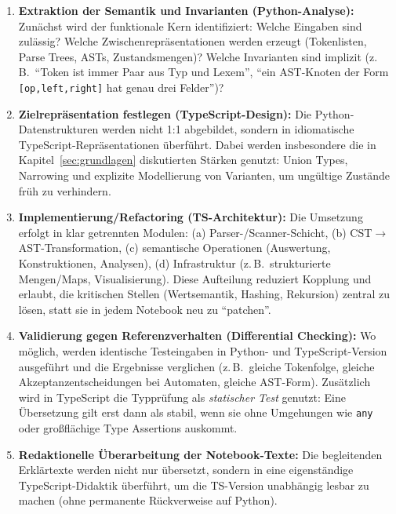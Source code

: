 \begin{enumerate}
    \item \textbf{Extraktion der Semantik und Invarianten (Python-Analyse):}
    Zunächst wird der funktionale Kern identifiziert: Welche Eingaben sind zulässig? Welche Zwischenrepräsentationen werden erzeugt (Tokenlisten, Parse Trees, ASTs, Zustandsmengen)? Welche Invarianten sind implizit (z.\,B.\ \enquote{Token ist immer Paar aus Typ und Lexem}, \enquote{ein AST-Knoten der Form \texttt{[op,left,right]} hat genau drei Felder})?

    \item \textbf{Zielrepräsentation festlegen (TypeScript-Design):}
    Die Python-Datenstrukturen werden nicht 1:1 abgebildet, sondern in idiomatische TypeScript-Repräsentationen überführt. Dabei werden insbesondere die in Kapitel~\ref{sec:grundlagen} diskutierten Stärken genutzt: Union Types, Narrowing und explizite Modellierung von Varianten, um ungültige Zustände früh zu verhindern.

    \item \textbf{Implementierung/Refactoring (TS-Architektur):}
    Die Umsetzung erfolgt in klar getrennten Modulen:
    (a) Parser-/Scanner-Schicht,
    (b) CST$\rightarrow$AST-Transformation,
    (c) semantische Operationen (Auswertung, Konstruktionen, Analysen),
    (d) Infrastruktur (z.\,B.\ strukturierte Mengen/Maps, Visualisierung).
    Diese Aufteilung reduziert Kopplung und erlaubt, die kritischen Stellen (Wertsemantik, Hashing, Rekursion) zentral zu lösen, statt sie in jedem Notebook neu zu \enquote{patchen}.

    \item \textbf{Validierung gegen Referenzverhalten (Differential Checking):}
    Wo möglich, werden identische Testeingaben in Python- und TypeScript-Version ausgeführt und die Ergebnisse verglichen (z.\,B.\ gleiche Tokenfolge, gleiche Akzeptanzentscheidungen bei Automaten, gleiche AST-Form). Zusätzlich wird in TypeScript die Typprüfung als \emph{statischer Test} genutzt: Eine Übersetzung gilt erst dann als stabil, wenn sie ohne Umgehungen wie \texttt{any} oder großflächige Type Assertions auskommt.

    \item \textbf{Redaktionelle Überarbeitung der Notebook-Texte:}
    Die begleitenden Erklärtexte werden nicht nur übersetzt, sondern in eine eigenständige TypeScript-Didaktik überführt, um die TS-Version unabhängig lesbar zu machen (ohne permanente Rückverweise auf Python).
\end{enumerate}

